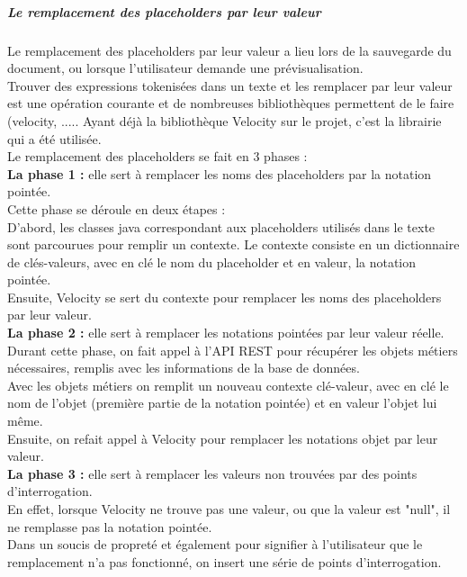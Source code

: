\subparagraph*{Le remplacement des placeholders par leur valeur}
Le remplacement des placeholders par leur valeur a lieu lors de la sauvegarde du document, ou lorsque l'utilisateur demande une prévisualisation.\\

Trouver des expressions tokenisées dans un texte et les remplacer par leur valeur est une opération courante et de nombreuses bibliothèques permettent de le faire (velocity, ..... %
Ayant déjà la bibliothèque Velocity sur le projet, c'est la librairie qui a été utilisée.\\

Le remplacement des placeholders se fait en 3 phases : \\

\textbf{La phase 1 :} elle sert à remplacer les noms des placeholders par la notation pointée.\\
Cette phase se déroule en deux étapes : \\
D'abord, les classes java correspondant aux placeholders utilisés dans le texte sont parcourues pour remplir un contexte. Le contexte consiste en un dictionnaire de clés-valeurs, avec en clé le nom du placeholder et en valeur, la notation pointée.\\
Ensuite, Velocity se sert du contexte pour remplacer les noms des placeholders par leur valeur.\\


\textbf{La phase 2 :} elle sert à remplacer les notations pointées par leur valeur réelle.\\
Durant cette phase, on fait appel à l'API REST pour récupérer les objets métiers nécessaires, remplis avec les informations de la base de données.\\
Avec les objets métiers on remplit un nouveau contexte clé-valeur, avec en clé le nom de l'objet (première partie de la notation pointée) et en valeur l'objet lui même.\\
Ensuite, on refait appel à Velocity pour remplacer les notations objet par leur valeur.\\

\textbf{La phase 3 :} elle sert à remplacer les valeurs non trouvées par des points d'interrogation.\\
En effet, lorsque Velocity ne trouve pas une valeur, ou que la valeur est "null", il ne remplasse pas la notation pointée.\\
Dans un soucis de propreté et également pour signifier à l'utilisateur que le remplacement n'a pas fonctionné, on insert une série de points d'interrogation.\\

